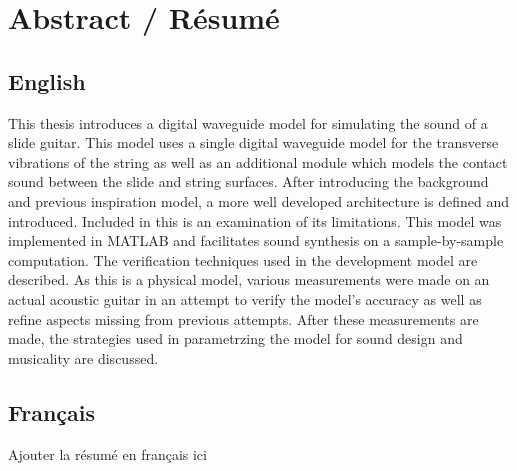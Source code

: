 \documentclass[../main.tex]{subfiles}
\begin{document}
\chapter*{Abstract / Résumé}
\section*{English}
This thesis introduces a digital waveguide model for simulating the sound of a slide guitar. This model uses a single digital waveguide model for the transverse vibrations of the string as well as an additional module which models the contact sound between the slide and string surfaces. After introducing the background and previous inspiration model, a more well developed architecture is defined and introduced. Included in this is an examination of its limitations. This model was implemented in MATLAB and facilitates sound synthesis on a sample-by-sample computation. The verification techniques used in the development model are described. As this is a physical model, various measurements were made on an actual acoustic guitar in an attempt to verify the model's accuracy as well as refine aspects missing from previous attempts. After these measurements are made, the strategies used in parametrzing the model for sound design and musicality are discussed.

\section*{Français}
Ajouter la résumé en français ici
\end{document}
